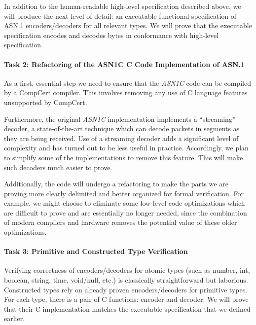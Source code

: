 \documentclass[acmsmall,nonacm]{acmart}
\begin{document}
In addition to the human-readable high-level specification described above, we will produce the next level of detail: an executable functional specification of ASN.1 encoders/decoders for all relevant types. We will prove that the executable specification encodes and decodes bytes in conformance with high-level specification.

\paragraph{Task 2: Refactoring of the ASN1C C Code Implementation of ASN.1}

As a first, essential step we need to ensure that the \emph{ASN1C} code can be compiled by a CompCert compiler. This involves removing any use of C language features unsupported by CompCert.

Furthermore, the original \emph{ASN1C} implementation implements a ``streaming'' decoder, a state-of-the-art technique which can decode packets in segments as they are being received. Use of a streaming decoder adds a significant level of complexity and has turned out to be less useful in practice. Accordingly, we plan to simplify some of the implementations to remove this feature. This will make such decoders much easier to prove.

Additionally, the code will undergo a refactoring to make the parts we are proving more clearly delimited and better organized for formal verification. For example, we might choose to eliminate some low-level code optimizations which are difficult to prove and are essentially no longer needed, since the combination of modern compilers and hardware removes the potential value of these older optimizations.

\paragraph{Task 3: Primitive and Constructed Type Verification}
Verifying correctness of encoders/decoders for atomic types (such as number, int, boolean, string, time, void/null, etc.) is classically straightforward but laborious. Constructed types rely on already proven encoders/decoders for primitive types. 
For each type, there is a pair of C functions: encoder and decoder. We will prove that their C implementation matches the executable specification that we defined earlier.
\end{document}
